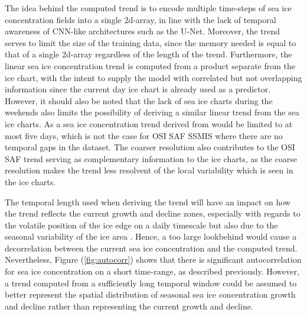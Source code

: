 \documentclass[../main/thesis.tex]{subfiles}
\begin{document}
The idea behind the computed trend is to encode multiple time-steps of sea ice concentration fields into a single 2d-array, in line with the lack of temporal awareness of CNN-like architectures such as the U-Net. Moreover, the trend serves to limit the size of the training data, since the memory needed is equal to that of a single 2d-array regardless of the length of the trend. Furthermore, the linear sea ice concentration trend is computed from a product separate from the ice chart, with the intent to supply the model with correlated but not overlapping information since the current day ice chart is already used as a predictor. However, it should also be noted that the lack of sea ice charts during the weekends \citep{Dinessen2020} also limits the possibility of deriving a similar linear trend from the sea ice charts. As a sea ice concentration trend derived from \citet{Dinessen2020} would be limited to at most five days, which is not the case for OSI SAF SSMIS where there are no temporal gaps in the dataset. The coarser resolution also contributes to the OSI SAF trend serving as complementary information to the ice charts, as the coarse resolution makes the trend less resolvent of the local variability which is seen in the ice charts.

The temporal length used when deriving the trend will have an impact on how the trend reflects the current growth and decline zones, especially with regards to the volatile position of the ice edge on a daily timescale but also due to the seasonal variability of the ice area \citep{Holland2016}. Hence, a too large lookbehind would cause a decorrelation between the current sea ice concentration and the computed trend. Nevertheless, Figure (\ref{fig:autocorr}) shows that there is significant autocorrelation for sea ice concentration on a short time-range, as described previously. However, a trend computed from a sufficiently long temporal window could be assumed to better represent the spatial distribution of seasonal sea ice concentration growth and decline rather than representing the current growth and decline.
\end{document}
